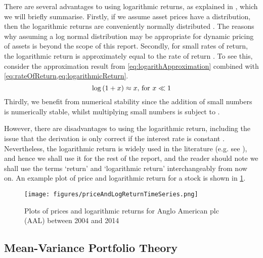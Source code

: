 There are several advantages to using logarithmic returns, as explained in \cite{QuaWp}, which we will briefly summarise.
Firstly, if we assume asset prices have a  distribution, then the logarithmic returns are conveniently normally distributed \cite{QuaWp}. The reasons why assuming a log normal distribution may be appropriate for dynamic pricing of assets is beyond the scope of this report.
Secondly, for small rates of return, the logarithmic return is approximately equal to the rate of return \cite{QuaWp}. To see this, consider the approximation result from \cref{eq:logarithApproximation} combined with \cref{eq:rateOfReturn,eq:logarithmicReturn}.
\begin{equation}
	\label{eq:logarithApproximation}
	\log \left( 1 + x \right) \approx x \text{, for } x \ll 1
\end{equation}
Thirdly, we benefit from numerical stability since the addition of small numbers is numerically stable, whilst multiplying small numbers is subject to  \cite{QuaWp}.

However, there are disadvantages to using the logarithmic return, including the issue that the derivation is only correct if the interest rate is constant \cite{QuaWp,Onn02}.
Nevertheless, the logarithmic return is widely used in the literature (e.g. see \cite{Onn02,OCK+02,OKK03,FPM+10,FPW+11,MG13}), and hence we shall use it for the rest of the report, and the reader should note we shall use the terms `return' and `logarithmic return' interchangeably from now on. An example plot of price and logarithmic return for a stock is shown in \cref{fig:priceAndLogReturn}.

\begin{figure}
	\centering
	\texttt{[image: figures/priceAndLogReturnTimeSeries.png]}
	\caption[Example plot for price and logarithmic return]{\label{fig:priceAndLogReturn} Plots of prices and logarithmic returns for Anglo American plc (AAL) between 2004 and 2014}
\end{figure}


\subsection{Mean-Variance Portfolio Theory}
\label{subsec:portfolioTheoryBackground}

